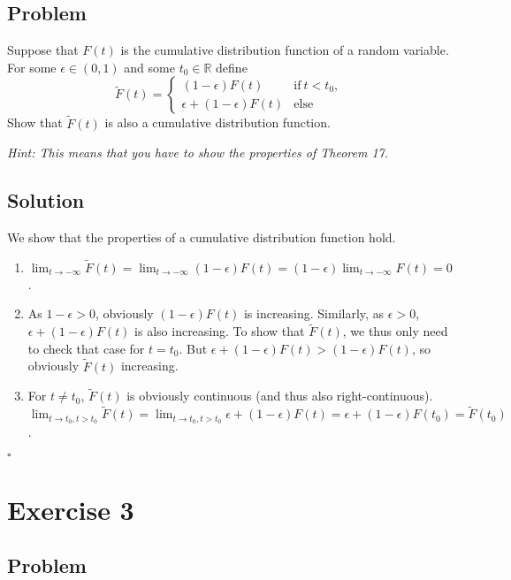 \documentclass[a4paper,10pt]{article}
\begin{document}
\subsection{Problem}

Suppose that $F(t)$ is the cumulative distribution function of a random variable.
For some $\epsilon \in (0, 1)$ and some $t_0 \in \mathbb{R}$ define
$$
\tilde{F}(t) = \begin{cases}
  (1 - \epsilon) F(t) & \mbox{if}\ t < t_0, \\
  \epsilon + (1 - \epsilon) F(t) & \mbox{else}
\end{cases}
$$
Show that $\tilde{F}(t)$ is also a cumulative distribution function.

\noindent \textit{Hint: This means that you have to show the properties of Theorem 17. }

\subsection{Solution}

We show that the properties of a cumulative distribution function hold.

\begin{enumerate}
  \item $\lim_{t \rightarrow -\infty}{\tilde{F}(t)} = \lim_{t \rightarrow -\infty}{(1 - \epsilon) F(t)} = (1 - \epsilon) \lim_{t \rightarrow -\infty}{F(t)} = 0$.
  \item As $1 - \epsilon > 0$, obviously $(1 - \epsilon) F(t)$ is increasing.
  Similarly, as $\epsilon > 0$, $\epsilon + (1 - \epsilon) F(t)$ is also increasing.
  To show that $\tilde{F}(t)$, we thus only need to check that case for $t = t_0$.
  But $\epsilon + (1 - \epsilon) F(t) > (1 - \epsilon) F(t)$, so obviously $\tilde{F}(t)$ increasing.
  \item For $t \neq t_0$, $\tilde{F}(t)$ is obviously continuous (and thus also right-continuous).
  $\lim_{t \rightarrow t_0, t > t_0}{\tilde{F}(t)} = \lim_{t \rightarrow t_0, t > t_0}{\epsilon + (1 - \epsilon) F(t)} = \epsilon + (1 - \epsilon) F(t_0) = \tilde{F}(t_0)$.
\end{enumerate}

{\raggedleft{}$\square$}

\section{Exercise 3}

\subsection{Problem}
\end{document}
